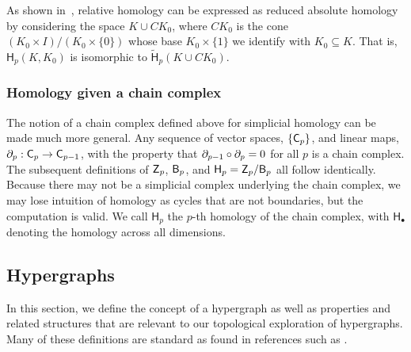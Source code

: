 \documentclass{amsart}
\newcommand{\Bgroup}        {\mm{\sf B}}
\newcommand{\Cgroup}        {\mm{\sf C}}
\newcommand{\Hgroup}	     {\mathsf{H}}
\newcommand{\Zgroup}        {\mm{\sf Z}}
\newcommand{\bdr}{\mm{\mathrm{\partial}}}
\newcommand {\mm}[1]        {\ifmmode{#1}\else{\mbox{\(#1\)}}\fi}
\begin{document}
As shown in~\cite[pp. 124-125]{Hatcher}, relative homology can be expressed as reduced absolute homology by considering the space $K \cup CK_0$, where $CK_0$ is the cone $(K_0 \times I)/(K_0 \times \{0\})$ whose base $K_0 \times \{1\}$ we identify with $K_0 \subseteq K$.
That is, $\Hgroup_p(K, K_0)$ is isomorphic to $\tilde{\Hgroup}_p(K \cup CK_0)$.%

\subsubsection{Homology given a chain complex}
\label{sec:chain-homology}
The notion of a chain complex defined above for simplicial homology can be made much more general.
Any sequence of vector spaces, $\{\Cgroup_p\}$, and linear maps, $\bdr_p : \Cgroup_p \rightarrow \Cgroup_{p-1}$, with the property that $\bdr_{p-1}\circ\bdr_{p} = 0$ for all $p$ is a chain complex.
The subsequent definitions of $\Zgroup_p$, $\Bgroup_p$, and $\Hgroup_p = \Zgroup_{p}/\Bgroup_p$ all follow identically.
Because there may not be a simplicial complex underlying the chain complex,  we may lose intuition of homology as cycles that are not boundaries, but the computation is valid. We call $\Hgroup_p$ the $p$-th homology of the chain complex, with $\Hgroup_{\bullet}$ denoting the homology across all dimensions.

\subsection{Hypergraphs}
In this section, we define the concept of a hypergraph as well as properties and related structures that are relevant to our topological exploration of hypergraphs. Many of these definitions are standard as found in references such as \cite{berge1984hypergraphs,bretto2013hypergraph,aksoy_hypernetwork_2020}.
\end{document}
